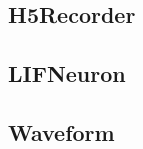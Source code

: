 
\subsection{H5Recorder}
\label{entities:h5recorder}


\subsection{LIFNeuron}
\label{entities:lifneuron}

\subsection{Waveform}
\label{entities:waveform}
